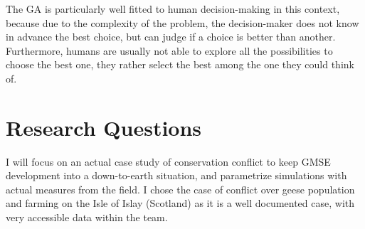 \documentclass[12pt,a4paper]{article}
\begin{document}
The GA is particularly well fitted to human decision-making in this context, because due to the complexity of the problem, the decision-maker does not know in advance the best choice, but can judge if a choice is better than another.
Furthermore, humans are usually not able to explore all the possibilities to choose the best one, they rather select the best among the one they could think of.
%
%

\section{Research Questions}
I will focus on an actual case study of conservation conflict to keep GMSE development into a down-to-earth situation, and parametrize simulations with actual measures from the field.
I chose the case of conflict over geese population and farming on the Isle of Islay (Scotland) as it is a well documented case, with very accessible data within the team.
\end{document}

